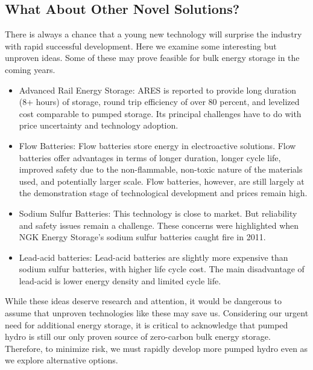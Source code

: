 \documentclass[hidelinks,12pt,a4paper]{article}
\begin{document}
\subsection{What About Other Novel Solutions?}
There is always a chance that a young new technology will surprise the industry with rapid successful development. Here we examine some interesting but unproven ideas. Some of these may prove feasible for bulk energy storage in the coming years.

{\footnotesize
\begin{itemize}
    \item Advanced Rail Energy Storage: ARES is reported to provide long duration (8+ hours) of storage, round trip efficiency of over 80 percent, and levelized cost comparable to pumped storage. Its principal challenges have to do with price uncertainty and technology adoption. \cite{EnergyStorageCaliforniaClimateandEnergyGoals}

    \item Flow Batteries: Flow batteries store energy in electroactive solutions. Flow batteries offer advantages in terms of longer duration, longer cycle life, improved safety due to the non-flammable, non-toxic nature of the materials used, and potentially larger scale. Flow batteries, however, are still largely at the demonstration stage of technological development and prices remain high. \cite{EnergyStorageCaliforniaClimateandEnergyGoals}

    \item Sodium Sulfur Batteries: This technology is close to market. But reliability and safety issues remain a challenge. These concerns were highlighted when NGK Energy Storage’s sodium sulfur batteries caught fire in 2011. \cite{EnergyStorageCaliforniaClimateandEnergyGoals}

    \item Lead-acid batteries: Lead-acid batteries are slightly more expensive than sodium sulfur batteries, with higher life cycle cost. The main disadvantage of lead-acid is lower energy density and limited cycle life. \cite{EnergyStorageCaliforniaClimateandEnergyGoals}
\end{itemize}
}

While these ideas deserve research and attention, it would be dangerous to assume that unproven technologies like these may save us.
Considering our urgent need for additional energy storage, it is critical to acknowledge that pumped hydro is still our only proven source of zero-carbon bulk energy storage. Therefore, to minimize risk, we must rapidly develop more pumped hydro even as we explore alternative options.
\end{document}
